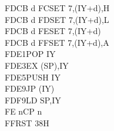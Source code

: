 \begin{multicols}{3}
{\begin{tabbing}
    FDCB d FC\>SET 7,(IY+d),H\UNDOC\\
    FDCB d FD\>SET 7,(IY+d),L\UNDOC\\
    FDCB d FE\>SET 7,(IY+d)\\
    FDCB d FF\>SET 7,(IY+d),A\UNDOC\\
    FDE1\>POP IY\\
    FDE3\>EX (SP),IY\\
    FDE5\>PUSH IY\\
    FDE9\>JP (IY)\\
    FDF9\>LD SP,IY\\
    FE n\>CP n\\
    FF\>RST 38H
\end{tabbing}
}
\end{multicols}
\normalsize

\pagebreak
\IntentionallyEmpty
\pagebreak
